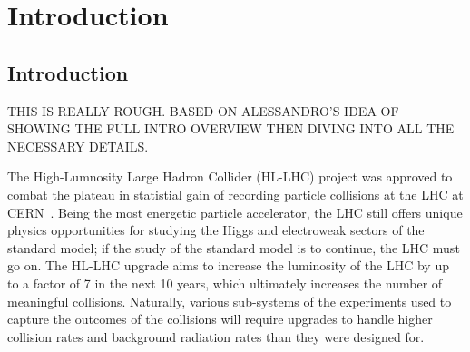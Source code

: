 
\chapter{Introduction}
\label{chap:intro}


\section{Introduction}

THIS IS REALLY ROUGH. BASED ON ALESSANDRO'S IDEA OF SHOWING THE FULL INTRO OVERVIEW THEN DIVING INTO ALL THE NECESSARY DETAILS.

The High-Lumnosity Large Hadron Collider (HL-LHC) project was approved to combat the plateau in statistial gain of recording particle collisions at the LHC at CERN~\cite{hl_lhc_tdr}. Being the most energetic particle accelerator, the LHC still offers unique physics opportunities for studying the Higgs and electroweak sectors of the standard model; if the study of the standard model is to continue, the LHC must go on. The HL-LHC upgrade aims to increase the luminosity of the LHC by up to a factor of 7 in the next 10 years, which ultimately increases the number of meaningful collisions. Naturally, various sub-systems of the experiments used to capture the outcomes of the collisions will require upgrades to handle higher collision rates and background radiation rates than they were designed for. 

